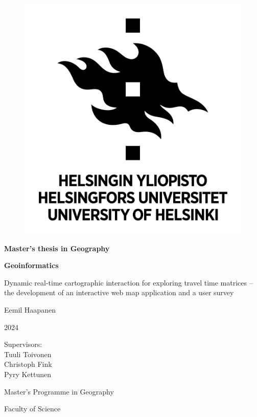 \newcommand{\mytitle}{
    Dynamic real-time cartographic interaction for exploring travel time matrices --
    the development of an interactive web map application and a user survey
}

\begin{center}{
    \begin{figure}[H]
        \centering
        \includegraphics[scale=0.4]{visual/other/helsinki_uni_logo.jpg}
    \end{figure}

    \bigskip
    \bigskip
    \bigskip
    \textbf{Master's thesis in Geography} \par
    \textbf{Geoinformatics} \par

    \bigskip
    \bigskip
    \mytitle

    \bigskip
    \bigskip
    Eemil Haapanen

    2024

    \vfill

    Supervisors: \\
    Tuuli Toivonen \\
    Christoph Fink \\
    Pyry Kettunen \par
    \bigskip
    \bigskip
    \bigskip
    Master's Programme in Geography \par
    Faculty of Science \par
}
\end{center}
